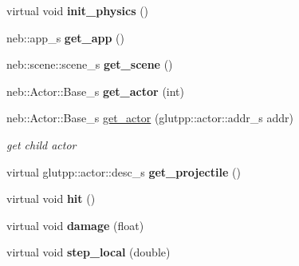 \begin{DoxyCompactItemize}
\item 
\hypertarget{classneb_1_1Actor_1_1Base_a731bb18d1c9ea82bffbb2a21142bdd27}{virtual void {\bfseries init\-\_\-physics} ()}\label{classneb_1_1Actor_1_1Base_a731bb18d1c9ea82bffbb2a21142bdd27}

\item 
\hypertarget{classneb_1_1Actor_1_1Base_ae3983e94b6e4311f9830fb257bdd430b}{neb\-::app\-\_\-s {\bfseries get\-\_\-app} ()}\label{classneb_1_1Actor_1_1Base_ae3983e94b6e4311f9830fb257bdd430b}

\item 
\hypertarget{classneb_1_1Actor_1_1Base_a9ecd15cc92581b224343e345533ceda8}{neb\-::scene\-::scene\-\_\-s {\bfseries get\-\_\-scene} ()}\label{classneb_1_1Actor_1_1Base_a9ecd15cc92581b224343e345533ceda8}

\item 
\hypertarget{classneb_1_1Actor_1_1Base_af8d94037bac4bbef8205cb491ed8f6f6}{neb\-::\-Actor\-::\-Base\-\_\-s {\bfseries get\-\_\-actor} (int)}\label{classneb_1_1Actor_1_1Base_af8d94037bac4bbef8205cb491ed8f6f6}

\item 
neb\-::\-Actor\-::\-Base\-\_\-s \hyperlink{classneb_1_1Actor_1_1Base_a0e31f35ba460d472e9730d1e9e53933d}{get\-\_\-actor} (glutpp\-::actor\-::addr\-\_\-s addr)
\begin{DoxyCompactList}\small\item\em get child actor \end{DoxyCompactList}\item 
\hypertarget{classneb_1_1Actor_1_1Base_a6aea29e7c87c3bb8507d2e249fe18a9b}{virtual glutpp\-::actor\-::desc\-\_\-s {\bfseries get\-\_\-projectile} ()}\label{classneb_1_1Actor_1_1Base_a6aea29e7c87c3bb8507d2e249fe18a9b}

\item 
\hypertarget{classneb_1_1Actor_1_1Base_a83a135f3543d02c0bd8a6d32b6d1d386}{virtual void {\bfseries hit} ()}\label{classneb_1_1Actor_1_1Base_a83a135f3543d02c0bd8a6d32b6d1d386}

\item 
\hypertarget{classneb_1_1Actor_1_1Base_a4c2e2a30b3e7c801e9e4e04552e10b30}{virtual void {\bfseries damage} (float)}\label{classneb_1_1Actor_1_1Base_a4c2e2a30b3e7c801e9e4e04552e10b30}

\item 
\hypertarget{classneb_1_1Actor_1_1Base_af57cfb2160c8263244a2ee0bd9b4b254}{virtual void {\bfseries step\-\_\-local} (double)}\label{classneb_1_1Actor_1_1Base_af57cfb2160c8263244a2ee0bd9b4b254}


\end{DoxyCompactItemize}
